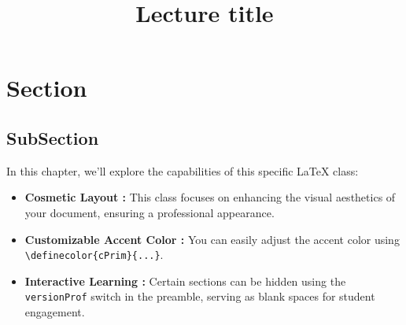 \documentclass[tikz-cross]{HSP-Lecture}
\title{Lecture title}
\begin{document}
	\maketitle
	
	\section{Section}
	\subsection{SubSection}
	In this chapter, we'll explore the capabilities of this specific \LaTeX{} class:
	
	\begin{itemize}
		\item \textbf{Cosmetic Layout :} This class focuses on enhancing the visual aesthetics of your document, ensuring a professional appearance.
		\item \textbf{Customizable Accent Color :} You can easily adjust the accent color using \\
		\verb|\definecolor{cPrim}{...}|.
		\item \textbf{Interactive Learning :} Certain sections can be hidden using the \verb|versionProf| switch in the preamble, serving as blank spaces for student engagement.
	\end{itemize}
	
\end{document}
